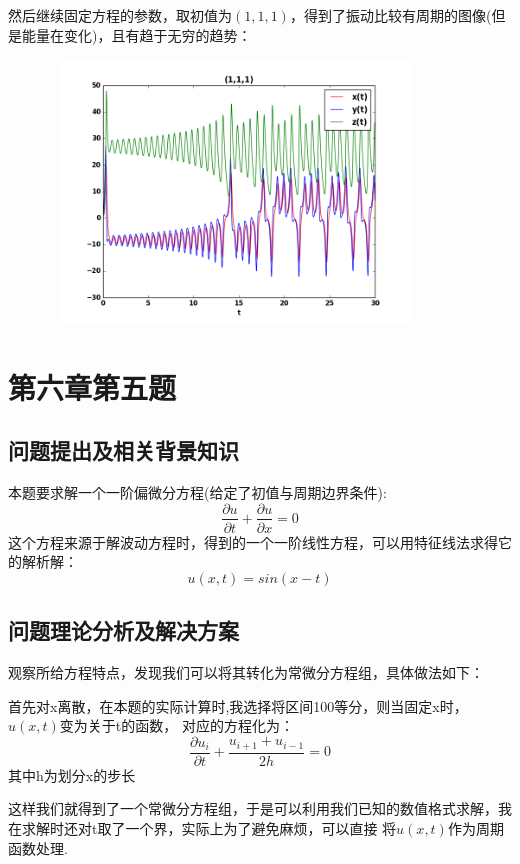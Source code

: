 \documentclass[10pt,a4paper]{ctexart}
\begin{document}
然后继续固定方程的参数，取初值为$(1,1,1)$，得到了振动比较有周期的图像(但是能量在变化)，且有趋于无穷的趋势：
\par
\centerline{\includegraphics[height=7cm,width=12cm]{lorenzh111.png}}
\par

\section{第六章第五题}
\subsection{问题提出及相关背景知识}
本题要求解一个一阶偏微分方程(给定了初值与周期边界条件):
\begin{equation*}
\dfrac{\partial u}{\partial t}+\dfrac{\partial u}{\partial x}=0
\end{equation*}
这个方程来源于解波动方程时，得到的一个一阶线性方程，可以用特征线法求得它的解析解：
\begin{equation*}
u(x,t)=sin(x-t)
\end{equation*}
\subsection{问题理论分析及解决方案}
观察所给方程特点，发现我们可以将其转化为常微分方程组，具体做法如下：

首先对x离散，在本题的实际计算时,我选择将区间100等分，则当固定x时，$u(x,t)$变为关于t的函数，
对应的方程化为：
\begin{equation*}
    \dfrac{\partial u_i}{\partial t}+\dfrac{u_{i+1}+u_{i-1}}{2h}=0
\end{equation*}
其中h为划分x的步长

这样我们就得到了一个常微分方程组，于是可以利用我们已知的数值格式求解，我在求解时还对t取了一个界，实际上为了避免麻烦，可以直接
将$u(x,t)$作为周期函数处理.
\end{document}
